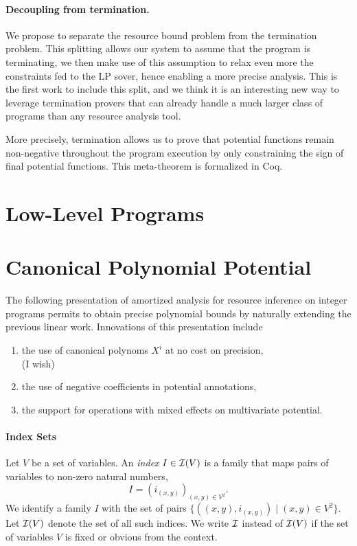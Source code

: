 \documentclass[nocopyrightspace,preprint]{sigplanconf-pldi15}
\begin{document}
\paragraph{Decoupling from termination.}
We
propose to separate the resource bound problem from the
termination problem.  This splitting allows our system
to assume that the program is terminating, we then make use
of this assumption to relax even more the constraints fed
to the LP sover, hence enabling a more precise analysis.
%
This is the first work to include this split, and we
think it is an interesting new way to leverage termination
provers that can already handle a much larger class of
programs than any resource analysis tool.

More precisely, termination allows us to prove that
potential functions remain non-negative throughout
the program execution by only constraining the sign of
final potential functions.  This meta-theorem is
formalized in Coq.


\section{Low-Level Programs}

\section{Canonical Polynomial Potential}

The following presentation of amortized analysis for resource
inference on integer programs permits to obtain precise polynomial
bounds by naturally extending the previous linear work. Innovations
of this presentation include
\begin{enumerate}
\item the use of canonical polynoms $X^i$ at no cost on precision,
 \\ (I wish)
\item the use of negative coefficients in potential annotations,
\item the support for operations with mixed effects on multivariate potential.
\end{enumerate}

\paragraph{Index Sets}

Let $V$ be a set of variables.  An \emph{index} $I \in \mathcal{I}(V)$ is a
family that maps pairs of variables to non-zero natural numbers,
$$
I = (i_{(x,y)})_{(x,y) \in V^2} .
$$
%
We identify a family $I$ with the set of pairs $\{ ((x,y),i_{(x,y)})
\mid (x,y) \in V^2\}$.
Let $\mathcal{I}(V)$ denote the set of all such indices.  We write $\mathcal{I}$
instead of $\mathcal{I}(V)$ if the set of variables $V$ is fixed or obvious
from the context.
%
\end{document}
